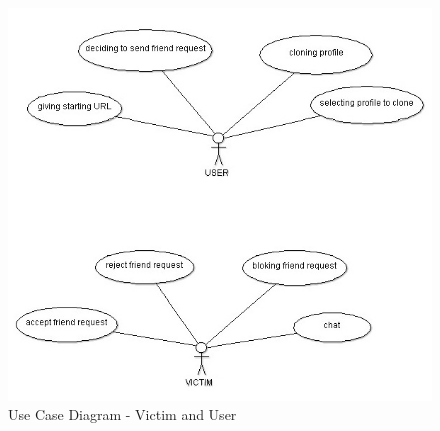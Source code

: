 \begin{figure}[H]
\centering
\includegraphics[scale=0.8]{project/diagrams/usecase2}
\caption{Use Case Diagram - Victim and User}
\label{fig:usecase2}
\end{figure}

